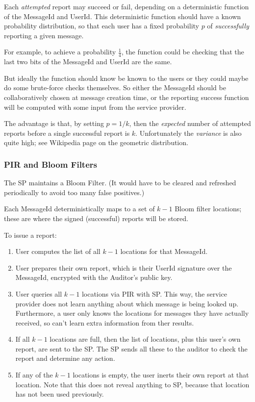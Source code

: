 \documentclass[letterpaper,12pt]{article}
\begin{document}
Each \emph{attempted} report may succeed or fail, depending on a
deterministic function of the MessageId and UserId. This deterministic
function should have a known probability distribution, so that each user
has a fixed probability $p$ of \emph{successfully} reporting a given
message.

For example, to achieve a probability $\tfrac{1}{4}$, the function could
be checking that the last two bits of the MessageId and UserId are the
same.

But ideally the function should know be known to the users or they could
maybe do some brute-force checks themselves. So either the MessageId
should be collaboratively chosen at message creation time, or the
reporting success function will be computed with some input from the
service provider.

The advantage is that, by setting $p=1/k$, then the \emph{expected}
number of attempted reports before a single successful report is $k$.
Unfortunately the \emph{variance} is also quite high; see Wikipedia page
on the geometric distribution.

\subsubsection{PIR and Bloom Filters}\label{sec:pir-bloom}

The SP maintains a Bloom Filter. (It would have to be cleared and
refreshed periodically to avoid too many false positives.)

Each MessageId deterministically maps to a set of $k-1$ Bloom filter
locations; these are where the signed (successful) reports will be
stored.

To issue a report:
\begin{enumerate}
  \item User computes the list of all $k-1$ locations for that
  MessageId.
  \item User prepares their own report, which is their UserId signature
  over the MessageId, encrypted with the Auditor's public key.
  \item User queries all $k-1$ locations via PIR with SP. This way, the
  service provider does not learn anything about which message is being
  looked up. Furthermore, a user only knows the locations for messages
  they have actually received, so can't learn extra information from
  ther results.
  \item If all $k-1$ locations are full, then the list of locations,
  plus this user's own report, are sent to the SP. The SP sends all
  these to the auditor to check the report and determine any action.
  \item If any of the $k-1$ locations is empty, the user inerts their
  own report at that location. Note that this does not reveal anything
  to SP, because that location has not been used previously.
\end{enumerate}
\end{document}
